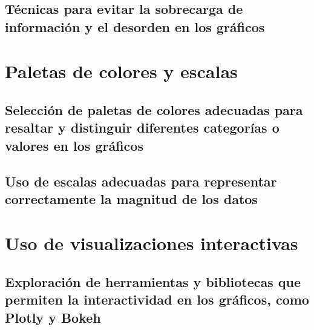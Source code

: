 \documentclass[
  a4paper,
]{article}
\begin{document}
\hypertarget{tuxe9cnicas-para-evitar-la-sobrecarga-de-informaciuxf3n-y-el-desorden-en-los-gruxe1ficos}{%
\subsection{Técnicas para evitar la sobrecarga de información y el
desorden en los
gráficos}\label{tuxe9cnicas-para-evitar-la-sobrecarga-de-informaciuxf3n-y-el-desorden-en-los-gruxe1ficos}}

\hypertarget{paletas-de-colores-y-escalas}{%
\section{Paletas de colores y
escalas}\label{paletas-de-colores-y-escalas}}

\hypertarget{selecciuxf3n-de-paletas-de-colores-adecuadas-para-resaltar-y-distinguir-diferentes-categoruxedas-o-valores-en-los-gruxe1ficos}{%
\subsection{Selección de paletas de colores adecuadas para resaltar y
distinguir diferentes categorías o valores en los
gráficos}\label{selecciuxf3n-de-paletas-de-colores-adecuadas-para-resaltar-y-distinguir-diferentes-categoruxedas-o-valores-en-los-gruxe1ficos}}

\hypertarget{uso-de-escalas-adecuadas-para-representar-correctamente-la-magnitud-de-los-datos}{%
\subsection{Uso de escalas adecuadas para representar correctamente la
magnitud de los
datos}\label{uso-de-escalas-adecuadas-para-representar-correctamente-la-magnitud-de-los-datos}}

\hypertarget{uso-de-visualizaciones-interactivas}{%
\section{Uso de visualizaciones
interactivas}\label{uso-de-visualizaciones-interactivas}}

\hypertarget{exploraciuxf3n-de-herramientas-y-bibliotecas-que-permiten-la-interactividad-en-los-gruxe1ficos-como-plotly-y-bokeh}{%
\subsection{Exploración de herramientas y bibliotecas que permiten la
interactividad en los gráficos, como Plotly y
Bokeh}\label{exploraciuxf3n-de-herramientas-y-bibliotecas-que-permiten-la-interactividad-en-los-gruxe1ficos-como-plotly-y-bokeh}}
\end{document}
